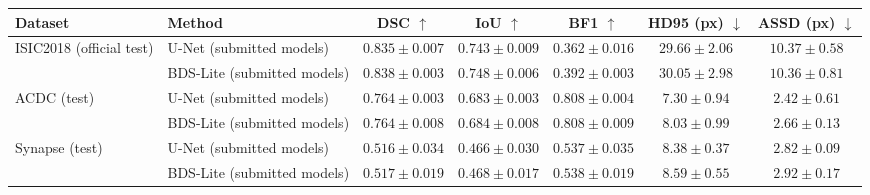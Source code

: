 \begin{tabular}{llccccc}
\toprule
Dataset & Method & DSC $\uparrow$ & IoU $\uparrow$ & BF1 $\uparrow$ & HD95 (px) $\downarrow$ & ASSD (px) $\downarrow$ \\
\midrule
ISIC2018 (official test) & U-Net (submitted models) & $0.835 \pm 0.007$ & $0.743 \pm 0.009$ & $0.362 \pm 0.016$ & $29.66 \pm 2.06$ & $10.37 \pm 0.58$ \\
 & BDS-Lite (submitted models) & $0.838 \pm 0.003$ & $0.748 \pm 0.006$ & $0.392 \pm 0.003$ & $30.05 \pm 2.98$ & $10.36 \pm 0.81$ \\
\midrule
ACDC (test) & U-Net (submitted models) & $0.764 \pm 0.003$ & $0.683 \pm 0.003$ & $0.808 \pm 0.004$ & $7.30 \pm 0.94$ & $2.42 \pm 0.61$ \\
 & BDS-Lite (submitted models) & $0.764 \pm 0.008$ & $0.684 \pm 0.008$ & $0.808 \pm 0.009$ & $8.03 \pm 0.99$ & $2.66 \pm 0.13$ \\
\midrule
Synapse (test) & U-Net (submitted models) & $0.516 \pm 0.034$ & $0.466 \pm 0.030$ & $0.537 \pm 0.035$ & $8.38 \pm 0.37$ & $2.82 \pm 0.09$ \\
 & BDS-Lite (submitted models) & $0.517 \pm 0.019$ & $0.468 \pm 0.017$ & $0.538 \pm 0.019$ & $8.59 \pm 0.55$ & $2.92 \pm 0.17$ \\
\bottomrule
\end{tabular}
